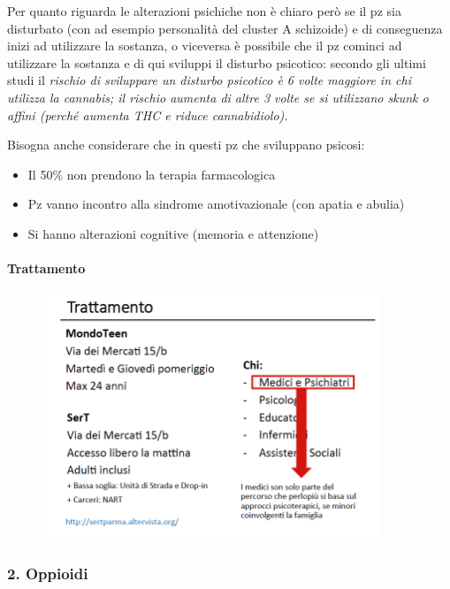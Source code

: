 Per quanto riguarda le alterazioni psichiche non è chiaro però se il pz
sia disturbato (con ad esempio personalità del cluster A schizoide) e di
conseguenza inizi ad utilizzare la sostanza, o viceversa è possibile che
il pz cominci ad utilizzare la sostanza e di qui sviluppi il disturbo
psicotico: secondo gli ultimi studi il \emph{rischio di sviluppare un
disturbo psicotico è 6 volte maggiore in chi utilizza la cannabis; il
rischio aumenta di altre 3 volte se si utilizzano skunk o affini (perché
aumenta THC e riduce cannabidiolo).}

Bisogna anche considerare che in questi pz che sviluppano psicosi:

\begin{itemize}
\item
  Il 50\% non prendono la terapia farmacologica
\item
  Pz vanno incontro alla sindrome amotivazionale (con apatia e abulia)
\item
  Si hanno alterazioni cognitive (memoria e attenzione)
\end{itemize}

\paragraph{Trattamento}

\begin{figure}[!ht]
\centering
	\includegraphics[width=0.9\textwidth]{017/image10.png}
\end{figure}

\subsubsection{2. Oppioidi}


